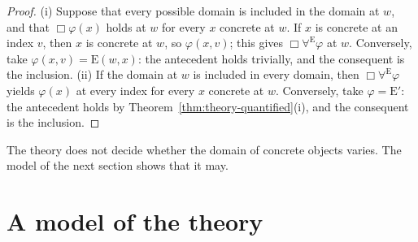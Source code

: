 \documentclass[11pt]{amsart}
\theoremstyle{plain}
\theoremstyle{definition}
\theoremstyle{remark}
\newcommand{\Conc}{\mathrm{E}}
\begin{document}
\begin{proof}
(i) Suppose that every possible domain is included in the domain at
$w$, and that $\Box\varphi(x)$ holds at $w$ for every $x$ concrete at
$w$. If $x$ is concrete at an index $v$, then $x$ is concrete at $w$,
so $\varphi(x,v)$; this gives $\Box\forall^{\Conc}\varphi$ at $w$. Conversely, take
$\varphi(x,v) = \Conc(w,x)$: the antecedent holds trivially, and the
consequent is the inclusion. (ii) If the domain at $w$ is included in
every domain, then $\Box\forall^{\Conc}\varphi$ yields $\varphi(x)$ at
every index for every $x$ concrete at $w$. Conversely, take
$\varphi = \Conc'$: the antecedent holds by
Theorem~\ref{thm:theory-quantified}(i), and the consequent is the
inclusion.
\end{proof}

The theory does not decide whether the domain of concrete objects
varies. The model of the next section shows that it may.

\section{A model of the theory}
\label{sec:model}
\end{document}
